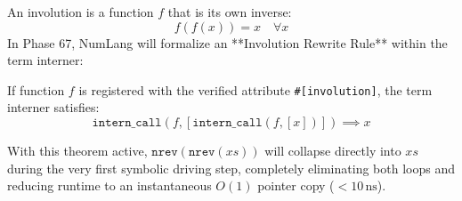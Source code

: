 An involution is a function $f$ that is its own inverse:
\begin{equation}
f(f(x)) = x \quad \forall x
\end{equation}
In Phase 67, NumLang will formalize an **Involution Rewrite Rule** within the term interner:
\begin{definition}
If function $f$ is registered with the verified attribute \texttt{\#[involution]}, the term interner satisfies:
\begin{equation}
\mathtt{intern\_call}(f, [\mathtt{intern\_call}(f, [x])]) \implies x
\end{equation}
\end{definition}
With this theorem active, $\mathtt{nrev}(\mathtt{nrev}(xs))$ will collapse directly into $xs$ during the very first symbolic driving step, completely eliminating both loops and reducing runtime to an instantaneous $O(1)$ pointer copy ($< 10\,\text{ns}$).
